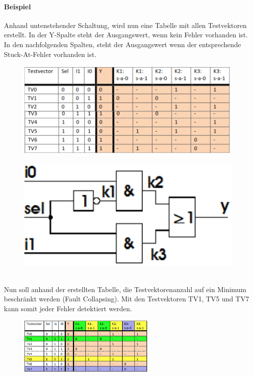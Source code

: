 \paragraph{Beispiel}
Anhand untenstehender Schaltung, wird nun eine Tabelle mit allen Testvektoren erstellt. In der Y-Spalte steht der Ausgangswert, wenn kein Fehler vorhanden ist. In den nachfolgenden Spalten, steht der Ausgangswert wenn der entsprechende Stuck-At-Fehler vorhanden ist.\ \\
\begin{minipage}{0.6\textwidth}
\begin{figure}[H]
    \includegraphics[width=1.0\textwidth]{images/stuckat_detektion_1.png}
\end{figure}
\end{minipage}
\hfill
\begin{minipage}{0.35\textwidth}
\begin{figure}[H]
    \includegraphics[width=1.0\textwidth]{images/stuckat_detektion_schaltung.png}
\end{figure}
\end{minipage} \\
Nun soll anhand der erstellten Tabelle, die Testvektorenanzahl auf ein Minimum beschränkt werden (Fault Collapsing). Mit den Testvektoren TV1, TV5 und TV7 kann somit jeder Fehler detektiert werden.
\begin{figure}[H]
    \includegraphics[width=0.6\textwidth]{images/stuckat_detektion_2.png}
\end{figure}

